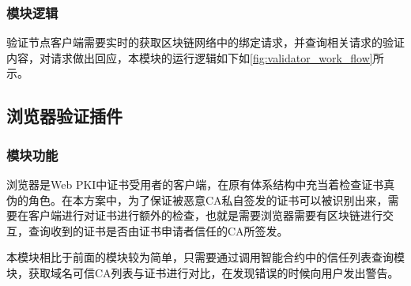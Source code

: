 \subsubsection{模块逻辑}

验证节点客户端需要实时的获取区块链网络中的绑定请求，并查询相关请求的验证内容，对请求做出回应，本模块的运行逻辑如下如\ref{fig:validator_work_flow}所示。










	



\subsection{浏览器验证插件}

\subsubsection{模块功能}

浏览器是Web PKI中证书受用者的客户端，在原有体系结构中充当着检查证书真伪的角色。在本方案中，为了保证被恶意CA私自签发的证书可以被识别出来，需要在客户端进行对证书进行额外的检查，也就是需要浏览器需要有区块链进行交互，查询收到的证书是否由证书申请者信任的CA所签发。

本模块相比于前面的模块较为简单，只需要通过调用智能合约中的信任列表查询模块，获取域名可信CA列表与证书进行对比，在发现错误的时候向用户发出警告。



